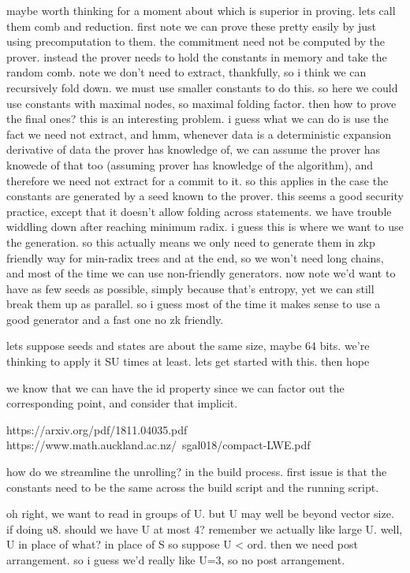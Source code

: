 maybe worth thinking for a moment about which is superior in proving. 
lets call them comb and reduction.
first note we can prove these pretty easily by just using precomputation to them. the commitment need not be computed by the prover. instead the prover needs to hold the constants in memory and take the random comb. note we don't need to extract, thankfully, so i think we can recursively fold down. we must use smaller constants to do this. so here we could use constants with maximal nodes, so maximal folding factor. then how to prove the final ones? this is an interesting problem. i guess what we can do is use the fact we need not extract, and 
hmm, whenever data is a deterministic expansion derivative of data the prover has knowledge of, we can assume the prover has knowede of that too (assuming prover has knowledge of the algorithm), and therefore we need not extract for a commit to it. so this applies in the case the constants are generated by a seed known to the prover. this seems a good security practice, except that it doesn't allow folding across statements.
we have trouble widdling down after reaching minimum radix. i guess this is where we want to use the generation. so this actually means we only need to generate them in zkp friendly way for min-radix trees and at the end, so we won't need long chains, and most of the time we can use non-friendly generators. now note we'd want to have as few seeds as possible, simply because that's entropy, yet we can still break them up as parallel. 
so i guess most of the time it makes sense to use a good generator and a fast one no zk friendly. 

lets suppose seeds and states are about the same size, maybe 64 bits. 
we're thinking to apply it SU times at least.
lets get started with this. then hope

we know that we can have the id property since we can factor out the corresponding point, and consider that implicit. 



https://arxiv.org/pdf/1811.04035.pdf
https://www.math.auckland.ac.nz/~sgal018/compact-LWE.pdf



how do we streamline the unrolling?
in the build process. 
first issue is that the constants need to be the same across the build script and the running script. 

oh right, we want to read in groups of U. but U may well be beyond vector size. 
if doing u8. should we have U at most 4? remember we actually like large U. well, U in place of what? in place of S 
so suppose U < ord. then we need post arrangement. so i guess we'd really like U=3, so no post arrangement.

